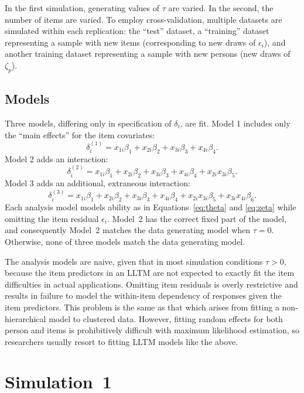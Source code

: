 \documentclass[12pt, letterpaper]{article}
\begin{document}
In the first simulation, generating values of $\tau$ are varied. In the second, the number of items are varied.
To employ cross-validation, multiple datasets are simulated within each replication: the ``test'' dataset, a ``training'' dataset representing a sample with new items (corresponding to new draws of $\epsilon_i$), and another training dataset representing a sample with new persons (new draws of $\zeta_p$).


\subsection{Models}

Three models, differing only in specification of $\delta_i$, are fit. Model 1 includes only the ``main effects'' for the item covariates:
\begin{equation}
\delta_i^{(1)} = x_{1i}\beta_1 + x_{2i}\beta_2 + x_{3i}\beta_3 + x_{4i}\beta_4
.\end{equation}
Model 2 adds an interaction:
\begin{equation}
\delta_i^{(2)} = x_{1i}\beta_1 + x_{2i}\beta_2 + x_{3i}\beta_3 + x_{4i}\beta_4
+ x_{2i}x_{3i}\beta_5
.\end{equation}
Model 3 adds an additional, extraneous interaction:
\begin{equation}
\delta_i^{(3)} = x_{1i}\beta_1 + x_{2i}\beta_2 + x_{3i}\beta_3 + x_{4i}\beta_4
+ x_{2i}x_{3i}\beta_5 + x_{3i}x_{4i}\beta_6
.\end{equation}
Each analysis model models ability as in Equations~\ref{eq:theta} and \ref{eq:zeta} while omitting the item residual $\epsilon_i$. 
Model~2 has the correct fixed part of the model, and consequently Model~2 matches the data generating model when $\tau = 0$. Otherwise, none of three models match the data generating model.
 
The analysis models are naive, given that in most simulation conditions $\tau > 0$, because the item predictors in an LLTM are not expected to exactly fit the item difficulties in actual applications.
Omitting item residuals is overly restrictive and results in failure to model the within-item dependency of responses given the item predictors. 
This problem is the same as that which arises from fitting a non-hierarchical model to clustered data. 
However, fitting random effects for both person and items is prohibitively difficult with maximum likelihood estimation, so researchers usually resort to fitting LLTM models like the above.


\section{Simulation~1}
\end{document}

